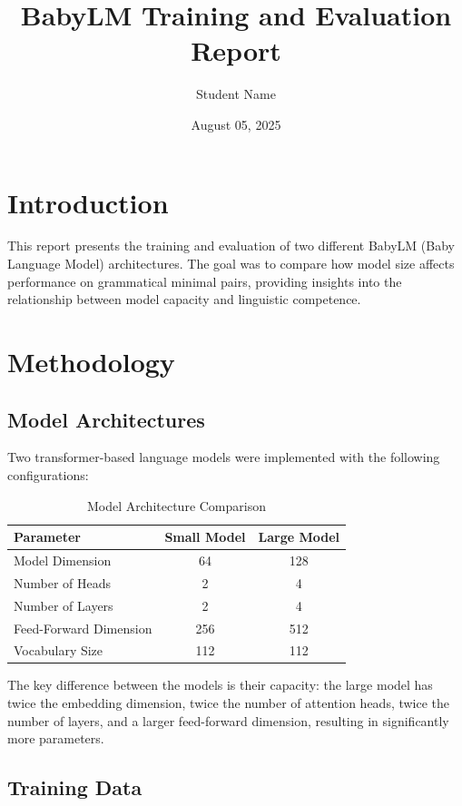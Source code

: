 \documentclass[11pt,a4paper]{article}
\title{BabyLM Training and Evaluation Report}
\author{Student Name}
\date{August 05, 2025}
\begin{document}
\maketitle

\section{Introduction}

This report presents the training and evaluation of two different BabyLM (Baby Language Model) architectures. The goal was to compare how model size affects performance on grammatical minimal pairs, providing insights into the relationship between model capacity and linguistic competence.

\section{Methodology}

\subsection{Model Architectures}

Two transformer-based language models were implemented with the following configurations:

\begin{table}[h]
\centering
\begin{tabular}{lcc}
\toprule
\textbf{Parameter} & \textbf{Small Model} & \textbf{Large Model} \\
\midrule
Model Dimension & 64 & 128 \\
Number of Heads & 2 & 4 \\
Number of Layers & 2 & 4 \\
Feed-Forward Dimension & 256 & 512 \\
Vocabulary Size & 112 & 112 \\
\bottomrule
\end{tabular}
\caption{Model Architecture Comparison}
\end{table}

The key difference between the models is their capacity: the large model has twice the embedding dimension, twice the number of attention heads, twice the number of layers, and a larger feed-forward dimension, resulting in significantly more parameters.

\subsection{Training Data}
\end{document}

